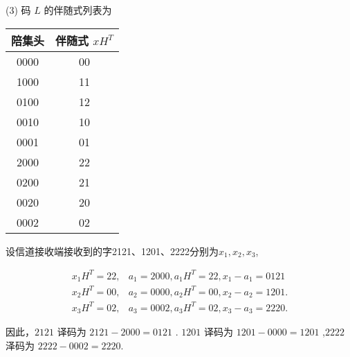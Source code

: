 \begin{tcolorbox}[breakable,colback=blue!5!white,colframe=blue!75!black,
 title= 解答题]
(3)%
码 $L$ 的伴随式列表为
\begin{center}
\begin{tabular}{c||c}
\hline 陪集头 & 伴随式 $xH^{T}$ \\
\hline 0000 & 00 \\
1000 & 11 \\
0100 & 12 \\
0010 & 10 \\
0001 & 01 \\
2000 & 22 \\
0200 & 21 \\
0020 & 20 \\
0002 & 02 \\
\hline
\end{tabular}
\end{center}

设信道接收端接收到的字2121、1201、2222分别为$x_1,x_2,x_3$,

$$
\begin{array}{ll}
x_{1} H^{T}=22, & a_{1}=2000, a_{1} H^{T}=22, x_{1}-a_{1}=0121 \\
x_{2} H^{T}=00, & a_{2}=0000, a_{2} H^{T}=00, x_{2}-a_{2}=1201 . \\
x_{3} H^{T}=02, & a_{3}=0002, a_{3} H^{T}=02, x_{3}-a_{3}=2220 .
\end{array}
$$

因此，$2121 $ 译码为 $ 2121-2000=0121$ . $1201 $ 译码为 $ 1201-0000=  1201$ ,$2222 $ 泽码为 $ 2222-0002=2220 $.
\end{tcolorbox}

\newpage

